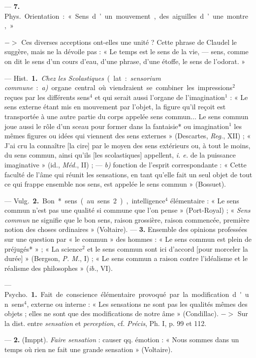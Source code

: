\begin{itemize}[leftmargin=1cm, label=, itemsep=1pt]
— {\bf 7.} \si{Phys.} Orientation : « Sens d’un mouvement, des aiguilles
d’une montre, »

$->$ Ces diverses acceptions ont-elles une unité ? Cette phrase de Claudel le
suggère, mais ne la dévoile pas : « Le temps est le sens de la vie, — sens,
comme on dit le sens d’un cours d’eau, d’une phrase, d’une étoffe, le sens de
l'odorat. »

 — \si{Hist.} {\bf 1.} {\it Chez les
Scolastiques} (lat. : {\it sensorium commune} :
{\it a)} organe central où viendraient se combiner les impressions$^2$ reçues
par les différents sens$^4$ et qui serait aussi l'organe de
l'imagination$^1$ : « Le sens externe étant mis en mouvement par l'objet, la
figure qu’il reçoit est transportée à une autre partie du corps appelée sens
commun... Le sens commun joue aussi le rôle d’un sceau pour former dans la
fantaisie* ou imagination$^1$ les mêmes figures ou idées qui viennent des
sens externes » (Descartes, {\it Reg.}, XII) ; « J'ai cru la connaître [la
cire] par le moyen des sens extérieurs ou, à tout le moins, du sens commun,
ainsi qu'ils [les scolastiques] appellent, {\it i. e.} de la puissance
imaginative » (id., {\it Méd.}, II) ; — {\it b)} fonction de l'esprit
correspondante : « Cette faculté de l’âme qui réunit les sensations, en tant
qu'elle fait un seul objet de tout ce qui frappe ensemble nos sens, est
appelée le sens commun » (Bossuet).

— \si{Vulg.} {\bf 2.} Bon* sens (au sens 2), intelligence$^4$ élémentaire :
« Le sens commun n’est pas une qualité si commune que l’on pense »
(Port-Royal) ; « {\it Sens commun} ne signifie que le bon sens, raison
grossière, raison commencée, première notion des choses ordinaires
» (Voltaire). —  {\bf 3.} Ensemble des opinions professées sur une question
par « le commun » des hommes : « Le sens commun est plein de préjugés* » ; «
La science$^2$ et le sens commun sont ici d'accord [pour morceler la durée]
» (Bergson, {\it P. M.}, I) ; « Le sens commun a raison contre l'idéalisme et
le réalisme des philosophes » ({\it ib.}, VI).

 — \si{Psycho.} {\bf 1.} Fait de conscience élémentaire
provoqué par la modification d'un sens$^4$, externe ou interne : « Les
sensations ne sont pas les qualités mêmes des objets ;
elles ne sont que des modifications de notre âme » (Condillac). $->$ Sur la
dist. entre {\it sensation} et {\it perception}, cf. {\it Précis}, Ph. I,
p. 99 et 112.

— {\bf 2.} (Imppt). {\it Faire sensation} : causer qq. émotion : « Nous
sommes dans un temps où rien ne fait une grande sensation » (Voltaire).


\end{itemize}
